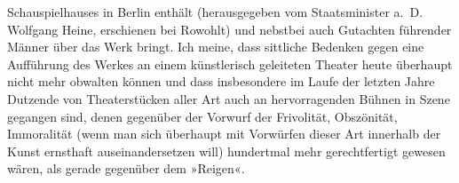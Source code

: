                   Schauspielhauses in Berlin enthält
               (herausgegeben vom Staats{\pb}minister a. D. Wolfgang Heine, erschienen bei Rowohlt) und nebstbei auch Gutachten führender Männer über
               das Werk bringt. Ich meine, dass sittliche Bedenken gegen eine Aufführung des Werkes an einem künstlerisch
               geleiteten Theater heute überhaupt nicht mehr obwalten können und dass insbesondere
               im Laufe der letzten Jahre Dutzende von Theaterstücken aller Art auch an
               hervorragenden Bühnen in Szene gegangen sind, denen gegenüber der Vorwurf der
               Frivolität, Obszönität, Immoralität (wenn man sich überhaupt mit Vorwürfen dieser Art
               innerhalb der Kunst ernsthaft auseinandersetzen will) hundertmal mehr gerechtfertigt
               gewesen wären, als gerade gegenüber dem »Reigen«.\pend
           
